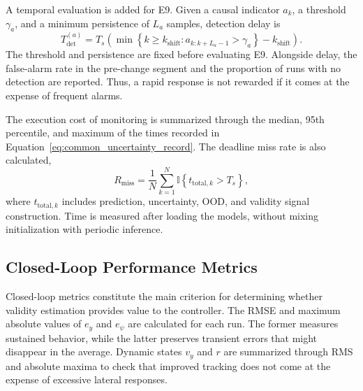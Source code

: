 \documentclass[12pt,a4paper]{report}
\begin{document}
A temporal evaluation is added for E9. Given a causal indicator $a_k$, a threshold $\gamma_a$, and a minimum persistence of $L_a$ samples, detection delay is
\begin{equation}
    T^{(a)}_{\mathrm{det}}
    =
    T_s\left(
        \min\left\{
            k\geq k_{\mathrm{shift}}:
            a_{k:k+L_a-1}>\gamma_a
        \right\}
        -k_{\mathrm{shift}}
    \right).
    \label{eq:shift_detection_delay}
\end{equation}
The threshold and persistence are fixed before evaluating E9. Alongside delay, the false-alarm rate in the pre-change segment and the proportion of runs with no detection are reported. Thus, a rapid response is not rewarded if it comes at the expense of frequent alarms.

The execution cost of monitoring is summarized through the median, 95th percentile, and maximum of the times recorded in Equation~\eqref{eq:common_uncertainty_record}. The deadline miss rate is also calculated,
\begin{equation}
    R_{\mathrm{miss}}
    =
    \frac{1}{N}
    \sum_{k=1}^{N}
    \mathbb I\!\left\{t_{\mathrm{total},k}>T_s\right\},
    \label{eq:deadline_miss_rate}
\end{equation}
where $t_{\mathrm{total},k}$ includes prediction, uncertainty, OOD, and validity signal construction. Time is measured after loading the models, without mixing initialization with periodic inference.

\subsection{Closed-Loop Performance Metrics}
\label{sec:metricas_lazo_cerrado}

Closed-loop metrics constitute the main criterion for determining whether validity estimation provides value to the controller. The RMSE and maximum absolute values of $e_y$ and $e_\psi$ are calculated for each run. The former measures sustained behavior, while the latter preserves transient errors that might disappear in the average. Dynamic states $v_y$ and $r$ are summarized through RMS and absolute maxima to check that improved tracking does not come at the expense of excessive lateral responses.
\end{document}
